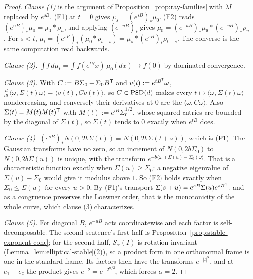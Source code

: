 \begin{proof}
\emph{Clause (1)} is the argument of Proposition~\ref{prop:ray-families} with $\lambda I$ replaced by
$e^{sB}$. (F1) at $t = 0$ gives $\mu_s = (e^{sB})_*\mu_0$. (F2) reads
$(e^{uB})_*\mu_0 = \mu_0 * \rho_u$, and applying $(e^{-uB})_*$ gives
$\mu_0 = (e^{-uB})_*\mu_0 * (e^{-uB})_*\rho_u$. For $s < t$,
$\mu_t = (e^{sB})_*(\mu_0 * \rho_{t-s}) = \mu_s * (e^{sB})_*\rho_{t-s}$. The converse is the same
computation read backwards.

\emph{Clause (2).} $\int f\,d\mu_t = \int f(e^{tB}x)\,\mu_0(dx) \to f(0)$ by dominated convergence.

\emph{Clause (3).} With $C := B\Sigma_0 + \Sigma_0B^{\mathsf{T}}$ and $v(t) := e^{tB^{\mathsf{T}}}\omega$,
$\tfrac{d}{dt}\langle\omega,\Sigma(t)\omega\rangle = \langle v(t), Cv(t)\rangle$, so $C \in \mathrm{PSD}(d)$ makes
every $t \mapsto \langle\omega,\Sigma(t)\omega\rangle$ nondecreasing, and conversely their derivatives at
$0$ are the $\langle\omega,C\omega\rangle$. Also $\Sigma(t) = M(t)M(t)^{\mathsf{T}}$ with
$M(t) := e^{tB}\Sigma_0^{1/2}$, whose squared entries are bounded by the diagonal of $\Sigma(t)$, so $\Sigma(t)$
tends to $0$ exactly when $e^{tB}$ does.

\emph{Clause (4).} $(e^{sB})_*N(0, 2b\Sigma(t)) = N(0, 2b\Sigma(t+s))$, which is (F1). The Gaussian
transforms have no zero, so an increment of $N(0,2b\Sigma_0)$ to $N(0,2b\Sigma(u))$ is unique, with the
transform $e^{-b\langle\omega,(\Sigma(u) - \Sigma_0)\omega\rangle}$. That is a characteristic function exactly
when $\Sigma(u) \ge \Sigma_0$: a negative eigenvalue of $\Sigma(u) - \Sigma_0$ would give it modulus above
$1$. So (F2) holds exactly when $\Sigma_0 \le \Sigma(u)$ for every $u > 0$. By (F1)'s transport
$\Sigma(s+u) = e^{sB}\Sigma(u)e^{sB^{\mathsf{T}}}$, and as a congruence preserves the Loewner order, that is the
monotonicity of the whole curve, which clause (3) characterizes.

\emph{Clause (5).} For diagonal $B$, $e^{-uB}$ acts coordinatewise and each factor is self-decomposable.
The second sentence's first half is Proposition~\ref{prop:stable-exponent-cone}; for the second half,
$S_\alpha(I)$ is rotation invariant (Lemma~\ref{lem:elliptical-stable}(2)), so a product form in one
orthonormal frame is one in the standard frame. Its factors then have the transforms $e^{-|t|^\alpha}$,
and at $e_1 + e_2$ the product gives $e^{-2} = e^{-2^{\alpha/2}}$, which forces $\alpha = 2$.
\end{proof}

